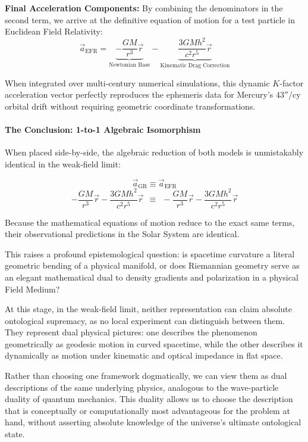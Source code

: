 \documentclass[
]{article}
\begin{document}
\textbf{Final Acceleration Components:} By combining the denominators in
the second term, we arrive at the definitive equation of motion for a
test particle in Euclidean Field Relativity:
\[\vec{a}_{\text{EFR}} = \underbrace{-\frac{GM}{r^3}\vec{r}}_{\text{Newtonian Base}} - \underbrace{\frac{3GMh^2}{c^2 r^5}\vec{r}}_{\text{Kinematic Drag Correction}}\]

When integrated over multi-century numerical simulations, this dynamic
\(K\)-factor acceleration vector perfectly reproduces the ephemeris data
for Mercury's \(43''\)/cy orbital drift without requiring geometric
coordinate transformations.

\paragraph{The Conclusion: 1-to-1 Algebraic
Isomorphism}\label{the-conclusion-1-to-1-algebraic-isomorphism}

When placed side-by-side, the algebraic reduction of both models is
unmistakably identical in the weak-field limit:

\[ \vec{a}_{\text{GR}} \equiv \vec{a}_{\text{EFR}} \]
\[ -\frac{GM}{r^3}\vec{r} - \frac{3GMh^2}{c^2 r^5}\vec{r} \ \ \equiv \ \ -\frac{GM}{r^3}\vec{r} - \frac{3GMh^2}{c^2 r^5}\vec{r} \]

Because the mathematical equations of motion reduce to the exact same
terms, their observational predictions in the Solar System are
identical.

This raises a profound epistemological question: is spacetime curvature
a literal geometric bending of a physical manifold, or does Riemannian
geometry serve as an elegant mathematical dual to density gradients and
polarization in a physical Field Medium?

At this stage, in the weak-field limit, neither representation can claim
absolute ontological supremacy, as no local experiment can distinguish
between them. They represent dual physical pictures: one describes the
phenomenon geometrically as geodesic motion in curved spacetime, while
the other describes it dynamically as motion under kinematic and optical
impedance in flat space.

Rather than choosing one framework dogmatically, we can view them as
dual descriptions of the same underlying physics, analogous to the
wave-particle duality of quantum mechanics. This duality allows us to
choose the description that is conceptually or computationally most
advantageous for the problem at hand, without asserting absolute
knowledge of the universe's ultimate ontological state.
\end{document}
